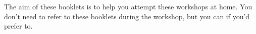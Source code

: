 The aim of these booklets is to help you attempt these workshops at home. You don't need to refer to these booklets during the workshop, but you can if you'd prefer to.